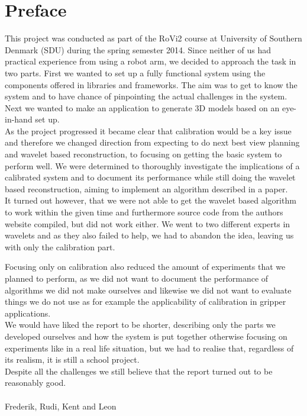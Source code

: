\chapter*{Preface}
This project was conducted as part of the RoVi2 course at University of Southern Denmark (SDU) during the spring semester 2014. Since neither of us had practical experience from using a robot arm, we decided to approach the task in two parts. First we wanted to set up a fully functional system using the components offered in libraries and frameworks. The aim was to get to know the system and to have chance of pinpointing the actual challenges in the system. Next we wanted to make an application to generate 3D models based on an eye-in-hand set up.\\

As the project progressed it became clear that calibration would be a key issue and therefore we changed direction from expecting to do next best view planning and wavelet based reconstruction, to focusing on getting the basic system to perform well. We were determined to thoroughly investigate the implications of a calibrated system and to document its performance while still doing the wavelet based reconstruction, aiming to implement an algorithm described in a paper. \\

It turned out however, that we were not able to get the wavelet based algorithm to work within the given time and furthermore source code from the authors website compiled, but did not work either. We went to two different experts in wavelets and as they also failed to help, we had to abandon the idea, leaving us with only the calibration part.

Focusing only on calibration also reduced the amount of experiments that we planned to perform, as we did not want to document the performance of algorithms we did not make ourselves and likewise we did not want to evaluate things we do not use as for example the applicability of calibration in gripper applications. \\

We would have liked the report to be shorter, describing only the parts we developed ourselves and how the system is put together otherwise focusing on experiments like in a real life situation, but we had to realise that, regardless of its realism, it is still a school project.\\

Despite all the challenges we still believe that the report turned out to be reasonably good.\\
 \\
 Frederik, Rudi, Kent and Leon